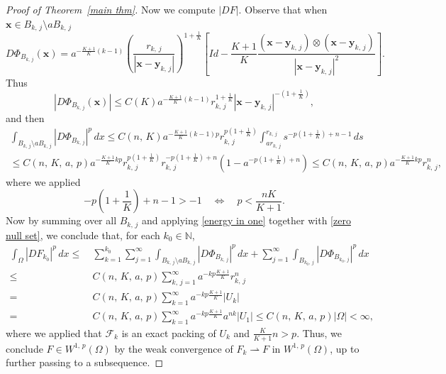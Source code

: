 \documentclass[reqno,11pt]{amsart}
\numberwithin{equation}{section}
\theoremstyle{remark}
\begin{document}
\begin{proof}[Proof of Theorem~\ref{main thm}]
 Now we compute $|DF|$. Observe that when $\mathbf x\in B_{k,\,j}\setminus a B_{k,\,j}$
$$D\Phi_{B_{k,\,j}}(\mathbf x) =a^{-\frac {K+1} K(k-1)}\left(\frac{r_{k,\,j}}{|\mathbf {x}-\mathbf {y}_{k,\,j}|}\right)^{1+\frac 1 K} \left[Id-\frac{K+1}{K} \frac{(\mathbf {x}-\mathbf {y}_{k,\,j})\otimes (\mathbf {x}-\mathbf {y}_{k,\,j})}{|\mathbf {x}-\mathbf {y}_{k,\,j}|^2}\right].$$
Thus
$$|D\Phi_{B_{k,\,j}}(\mathbf x)|\le C(K)a^{-\frac {K+1} K(k-1)} r_{k,\,j}^{1+\frac 1 K}|\mathbf {x}-\mathbf {y}_{k,\,j}|^{-\left(1+\frac 1 K\right)},$$
and then
\begin{multline}\label{energy in one}
\int_{B_{k,\,j}\setminus a B_{k,\,j}} |D\Phi_{B_{k,\,j}}|^p\,dx\le  C(n,\,K) a^{-\frac {K+1} K(k-1)p} r_{k,\,j}^{p\left(1+\frac 1 K\right)}\int_{ar_{k,\,j}}^{r_{k,\,j}} s^{-p\left(1+\frac 1 K\right)+n-1}\, ds \\
\le C(n,\,K,\,a,\,p) a^{-\frac {K+1} K kp} r_{k,\,j}^{p\left(1+\frac 1 K\right)} r_{k,\,j}^{-p\left(1+\frac 1 K\right)+n}(1-a^{-p\left(1+\frac 1 K\right)+n})\le C(n,\,K,\,a,\,p) a^{-\frac {K+1} K kp}r_{k,\,j}^n,
\end{multline}
where we applied
$$-p\left(1+\frac 1 K\right)+n-1> -1 \quad \Longleftrightarrow \quad p<\frac{nK}{K+1}.$$
Now by summing over all $B_{k,\,j}$ and applying \eqref{energy in one} together with \eqref{zero null set}, we conclude that, for each $k_0\in \mathbb N$,
\begin{align*}
\int_{\Omega} |DF_{k_0}|^p\,dx\le & \ \sum_{k=1}^{k_0}\sum_{j=1}^\infty\int_{B_{k,\,j}\setminus a B_{k,\,j}} |D\Phi_{B_{k,\,j}}|^p\,dx + \sum_{j=1}^{\infty}\int_{B_{k_0,\,j}} |D\Phi_{B_{k_0,\,j}}|^p\,dx \\
\le  & \ C(n,\,K,\,a,\,p)\sum_{k,\,j=1}^\infty a^{-kp\frac{K+1} K }r_{k,\,j}^n  \\ 
= & \ C(n,\,K,\,a,\,p)\sum_{k=1}^\infty a^{-kp\frac{K+1} K }|U_{k}|\\
=&\ C(n,\,K,\,a,\,p)\sum_{k=1}^\infty a^{-kp\frac{K+1} K } a^{nk}|U_1|
\le C(n,\,K,\,a,\,p) |\Omega|<\infty, 
\end{align*}
where we applied that $\mathcal F_k$ is an exact packing of $U_k$ and $\frac{K}{K+1}n>p$.
Thus, we conclude $F\in W^{1,\,p}(\Omega)$ by the weak convergence of $F_k\rightharpoonup F$ in $W^{1,\,p}(\Omega)$, up to further passing to a subsequence. 
\end{proof}
\end{document}
